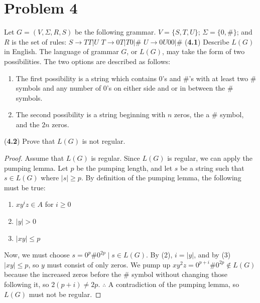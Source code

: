 \documentclass[11pt]{article}
\begin{document}
\newpage
\section*{Problem 4}

\noindent
Let $G=(V,\Sigma,R,S)$ be the following grammar. $V=\{S,T,U\}$; $\Sigma=\{0,\#\}$; and $R$ is the set of rules:
\newline
\newline
$S\rightarrow TT|U$
\newline
$T\rightarrow 0T|T0|\#$
\newline
$U\rightarrow 0U00|\#$
\newline
\newline
\noindent
(\textbf{4.1}) Describe $L(G)$ in English.
\newline
\newline
\noindent
The language of grammar $G$, or $L(G)$, may take the form of two possibilities. The two options are described as follows:
\begin{enumerate}
  \item The first possibility is a string which contains 0's and \#'s with at least two \# symbols and any number of 0's on either side and or in between the \# symbols.
  \item The second possibility is a string beginning with $n$ zeros, the a \# symbol, and the $2n$ zeros.
\end{enumerate}
\noindent
(\textbf{4.2}) Prove that $L(G)$ is not regular.
\begin{proof}
Assume that $L(G)$ is regular. Since $L(G)$ is regular, we can apply the pumping lemma. Let $p$ be the pumping length, and let $s$ be a string such that $s \in L(G)$ where $|s| \geq p$. By definition of the pumping lemma, the following must be true:
\begin{enumerate}
  \item $xy^{i}z \in A$ for $i \geq 0$
  \item $|y| > 0$
  \item $|xy| \leq p$
\end{enumerate}
Now, we must choose $s = 0^{p}\#0^{2p} \mid s \in L(G)$.
\newline
By (2), $i = |y|$, and by (3) $|xy| \leq p$, so $y$ must consist of only zeros.
\newline
We pump up $xy^{2}z = 0^{p+i}\#0^{2p} \notin L(G)$ because the increased zeros before the \# symbol without changing those following it, so $2(p+i) \neq 2p$.
\newline
$\therefore$ A contradiction of the pumping lemma, so $L(G)$ must not be regular.
\end{proof}
\end{document}
